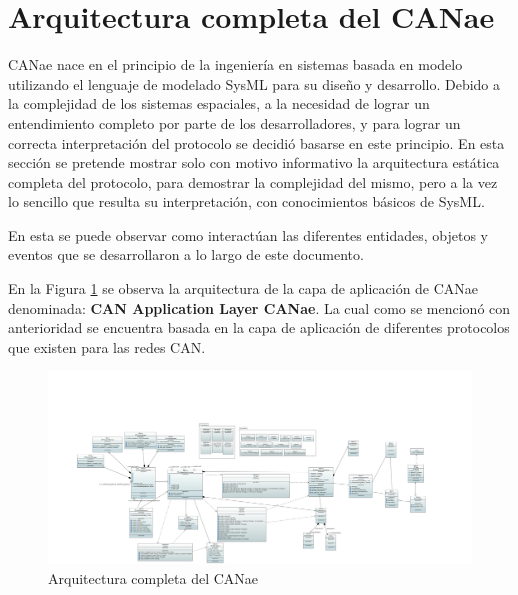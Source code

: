 \section{Arquitectura completa del CANae}
CANae nace en el principio de la ingeniería en sistemas basada en modelo
utilizando el lenguaje de modelado SysML para su diseño y desarrollo.
Debido a la complejidad de los sistemas espaciales, a la
necesidad de lograr un entendimiento completo por parte de los desarrolladores,
y para lograr un correcta interpretación del protocolo se decidió basarse en
este principio. En esta sección se pretende mostrar solo con motivo informativo
la arquitectura estática completa del protocolo, para demostrar la complejidad
del mismo, pero a la vez lo sencillo que resulta su interpretación, con
conocimientos básicos de SysML.

En esta se puede observar como interactúan las diferentes entidades, objetos y
eventos que se desarrollaron a lo largo de este documento.

En la Figura \ref{fig:Arq_CAN_App_Layer} se observa la arquitectura de la capa
de aplicación de CANae denominada: \textbf{CAN Application Layer CANae}. La cual
como se mencionó con anterioridad se encuentra basada en la capa de aplicación
de diferentes protocolos que existen para las redes CAN.

\begin{figure}
    \centering
    \includegraphics[scale=0.15]{images/Secciones/AppendixA/Complete_CANAppLayerCANae.JPG}
    \caption{Arquitectura completa del CANae}
    \label{fig:Arq_CAN_App_Layer}
\end{figure}
